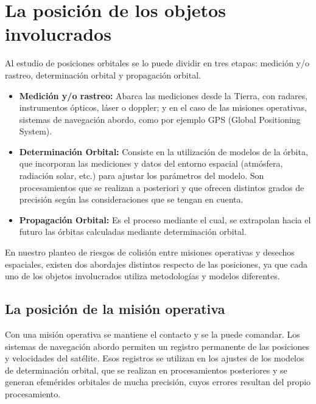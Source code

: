 \section{La posici\'on de los objetos involucrados}{\label{sec:posMision}}
Al estudio de posiciones orbitales se lo puede dividir en tres etapas: medici\'on y/o rastreo, determinaci\'on orbital y propagaci\'on orbital.

\begin{itemize}
\itemsep0em
 \item {\bf{Medici\'on y/o rastreo:}} Abarca las mediciones desde la Tierra, con radares, instrumentos \'opticos, l\'aser o doppler; y en el caso de las misiones operativas, sistemas de navegaci\'on abordo, como por ejemplo GPS (Global Positioning System).\\
 \item {\bf{Determinaci\'on Orbital:}} Consiste en la utilizaci\'on de modelos de la \'orbita, que incorporan las mediciones y datos del entorno espacial (atm\'osfera, radiaci\'on solar, etc.) para ajustar los par\'ametros del modelo. Son procesamientos que se realizan a posteriori y que ofrecen distintos grados de precisión seg\'un las consideraciones que se tengan en cuenta.\\
 \item {\bf{Propagaci\'on Orbital:}} Es el proceso mediante el cual, se extrapolan hacia el futuro las \'orbitas calculadas mediante determinaci\'on orbital.\\
\end{itemize}


En nuestro planteo de riesgos de colisi\'on entre misiones operativas y desechos espaciales, existen dos abordajes distintos respecto de las posiciones, ya que cada uno de los objetos involucrados utiliza metodolog\'ias y modelos diferentes.

\subsection{La posici\'on de la misi\'on operativa}

Con una misi\'on operativa se mantiene el contacto y se la puede comandar. Los sistemas de navegaci\'on abordo permiten un registro permanente de las posiciones y velocidades del sat\'elite. Esos registros se utilizan en los ajustes de los modelos de determinaci\'on orbital, que se realizan en procesamientos posteriores y se generan efem\'erides orbitales de mucha precisi\'on, cuyos errores resultan del propio procesamiento.\\

